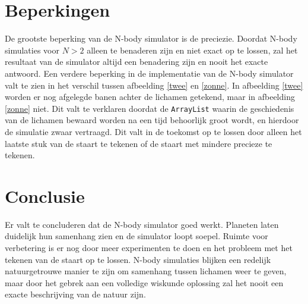 \documentclass[12pt]{article}
\begin{document}
\section{Beperkingen}
De grootste beperking van de N-body simulator is de preciezie. Doordat N-body simulaties voor $N > 2$ alleen te benaderen zijn en niet exact op te lossen, zal het resultaat van de simulator altijd een benadering zijn en nooit het exacte antwoord. Een verdere beperking in de implementatie van de N-body simulator valt te zien in het verschil tussen afbeelding \ref{twee} en \ref{zonne}. In afbeelding \ref{twee} worden er nog afgelegde banen achter de lichamen getekend, maar in afbeelding \ref{zonne} niet. Dit valt te verklaren doordat de \verb|ArrayList| waarin de geschiedenis van de lichamen bewaard worden na een tijd behoorlijk groot wordt, en hierdoor de simulatie zwaar vertraagd. Dit valt in de toekomst op te lossen door alleen het laatste stuk van de staart te tekenen of de staart met mindere precieze te tekenen.
\section{Conclusie}
Er valt te concluderen dat de N-body simulator goed werkt. Planeten laten duidelijk hun samenhang zien en de simulator loopt soepel. Ruimte voor verbetering is er nog door meer experimenten te doen en het probleem met het tekenen van de staart op te lossen. N-body simulaties blijken een redelijk natuurgetrouwe manier te zijn om samenhang tussen lichamen weer te geven, maar door het gebrek aan een volledige wiskunde oplossing zal het nooit een exacte beschrijving van de natuur zijn.
\end{document}
